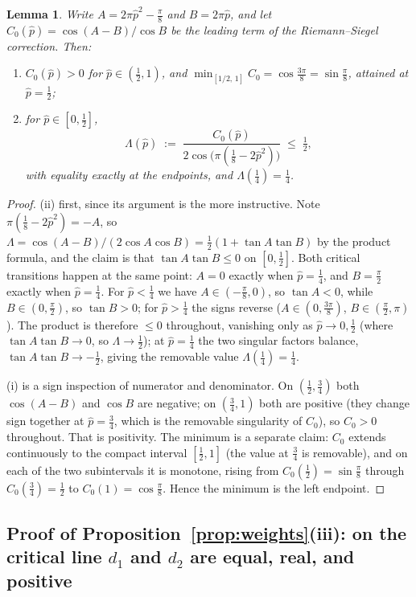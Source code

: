 \documentclass[11pt]{article}
\newtheorem{lemma}[theorem]{Lemma}
\theoremstyle{definition}
\begin{document}
\begin{lemma}\label{lem:C0-trig}
Write $A=2\pi\hat p^{2}-\tfrac\pi8$ and $B=2\pi\hat p$, and let
$C_0(\hat p)=\cos(A-B)/\cos B$ be the leading term of the Riemann--Siegel
correction. Then:
\begin{enumerate}
\item[(i)] $C_0(\hat p)>0$ for $\hat p\in(\tfrac12,1)$, and
$\min_{[1/2,\,1]}C_0=\cos\tfrac{3\pi}8=\sin\tfrac\pi8$, attained at
$\hat p=\tfrac12$;
\item[(ii)] for $\hat p\in[0,\tfrac12]$,
\[
\Lambda(\hat p)\;:=\;\frac{C_0(\hat p)}
{2\cos\bigl(\pi(\tfrac18-2\hat p^{2})\bigr)}
\;\leq\;\tfrac12,
\]
with equality exactly at the endpoints, and $\Lambda(\tfrac14)=\tfrac14$.
\end{enumerate}
\end{lemma}

\begin{proof}
(ii) first, since its argument is the more instructive. Note
$\pi(\tfrac18-2\hat p^{2})=-A$, so
$\Lambda=\cos(A-B)/(2\cos A\cos B)=\tfrac12(1+\tan A\tan B)$ by the product
formula, and the claim is that $\tan A\tan B\leq0$ on $[0,\tfrac12]$. Both
critical transitions happen at the same point: $A=0$ exactly when
$\hat p=\tfrac14$, and $B=\tfrac\pi2$ exactly when $\hat p=\tfrac14$. For
$\hat p<\tfrac14$ we have $A\in(-\tfrac\pi8,0)$, so $\tan A<0$, while
$B\in(0,\tfrac\pi2)$, so $\tan B>0$; for $\hat p>\tfrac14$ the signs
reverse ($A\in(0,\tfrac{3\pi}8)$, $B\in(\tfrac\pi2,\pi)$). The product is
therefore $\leq0$ throughout, vanishing only as $\hat p\to0,\tfrac12$
(where $\tan A\tan B\to0$, so $\Lambda\to\tfrac12$); at $\hat p=\tfrac14$
the two singular factors balance, $\tan A\tan B\to-\tfrac12$, giving the
removable value $\Lambda(\tfrac14)=\tfrac14$.

(i) is a sign inspection of numerator and denominator. On
$(\tfrac12,\tfrac34)$ both $\cos(A-B)$ and $\cos B$ are negative; on
$(\tfrac34,1)$ both are positive (they change sign together at
$\hat p=\tfrac34$, which is the removable singularity of $C_0$), so
$C_0>0$ throughout. That is positivity. The minimum is a separate
claim: $C_0$ extends continuously to the compact interval
$[\tfrac12,1]$ (the value at $\tfrac34$ is removable), and on each of
the two subintervals it is monotone, rising from
$C_0(\tfrac12)=\sin\tfrac\pi8$ through $C_0(\tfrac34)=\tfrac12$
to $C_0(1)=\cos\tfrac\pi8$. Hence the minimum is the left endpoint.
\end{proof}

\subsection{Proof of Proposition~\ref{prop:weights}(iii): on the critical line \texorpdfstring{$d_1$ and $d_2$}{d1 and d2} are equal, real, and positive}\label{sec:proof-iii}
\end{document}
